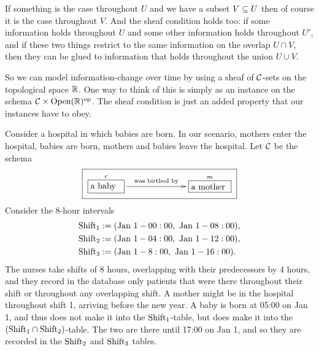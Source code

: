 \documentclass[CT4S-EN-RU]{subfiles}
\begin{document}
\begin{blockRUS}
\end{blockRUS}

\begin{blockENG}
If something is the case throughout $U$ and we have a subset $V\ss U$ then of course it is the case throughout $V$. And the sheaf condition holds too: if some information holds throughout $U$ and some other information holds throughout $U'$, and if these two things restrict to the same information on the overlap $U\cap V$, then they can be glued to information that holds throughout the union $U\cup V$.
\end{blockENG}

\begin{blockRUS}
\end{blockRUS}

\begin{blockENG}
So we can model information-change over time by using a sheaf of $\mcC$-sets on the topological space $\RR$. One way to think of this is simply as an instance on the schema $\mcC\times\Op(\RR)\op$. The sheaf condition is just an added property that our instances have to obey.
\end{blockENG}

\begin{blockRUS}
\end{blockRUS}

\begin{exampleENG}
Consider a hospital in which babies are born. In our scenario, mothers enter the hospital, babies are born, mothers and babies leave the hospital. Let $\mcC$ be the schema 
$$\fbox{\xymatrix{\obox{c}{.5in}{a baby}\LA{rr}{was birthed by}&\hspace{.2in}&\obox{m}{.6in}{a mother}}}$$
Consider the 8-hour intervals 
\begin{align*}
\tn{Shift}_1&:=(\tn{Jan }1 - 00:00,\tn{ Jan }1 - 08:00),\\
\tn{Shift}_2&:=(\tn{Jan }1 - 04:00,\tn{ Jan }1 - 12:00),\\
\tn{Shift}_3&:=(\tn{Jan }1 - 8:00,\tn{ Jan }1 - 16:00).
\end{align*}
The nurses take shifts of 8 hours, overlapping with their predecessors by 4 hours, and they record in the database only patients that were there throughout their shift or throughout any overlapping shift. A mother might be in the hospital throughout shift 1, arriving before the new year. A baby is born at 05:00 on Jan 1, and thus does not make it into the $\tn{Shift}_1$-table, but does make it into the $(\tn{Shift}_1\cap\tn{Shift}_2)$-table. The two are there until 17:00 on Jan 1, and so they are recorded in the $\tn{Shift}_2$ and $\tn{Shift}_3$ tables. 
\end{exampleENG}
\end{document}
